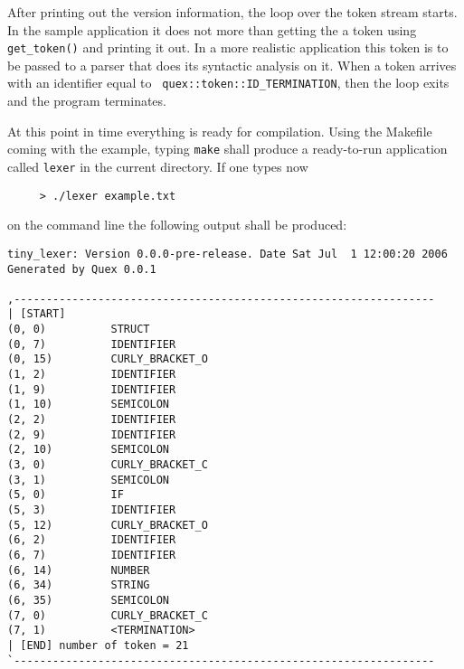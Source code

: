 After printing out the version information, the loop over the token stream
starts. In the sample application it does not more than getting the a token
using {\tt get\_token()} and printing it out. In a more realistic application
this token is to be passed to a parser that does its syntactic analysis on it.
When a token arrives with an identifier equal to {\tt
  quex::token::ID\_TERMINATION}, then the loop exits and the program
terminates.

At this point in time everything is ready for compilation. Using the Makefile
coming with the example, typing {\tt make} shall produce a ready-to-run
application called {\tt lexer}  in the current directory. If one types now

\begin{verbatim}
     > ./lexer example.txt
\end{verbatim}

on the command line the following output shall be produced:

\begin{samepage}
\begin{verbatim}
tiny_lexer: Version 0.0.0-pre-release. Date Sat Jul  1 12:00:20 2006
Generated by Quex 0.0.1

,-----------------------------------------------------------------
| [START]
(0, 0)          STRUCT
(0, 7)          IDENTIFIER
(0, 15)         CURLY_BRACKET_O
(1, 2)          IDENTIFIER
(1, 9)          IDENTIFIER
(1, 10)         SEMICOLON
(2, 2)          IDENTIFIER
(2, 9)          IDENTIFIER
(2, 10)         SEMICOLON
(3, 0)          CURLY_BRACKET_C
(3, 1)          SEMICOLON
(5, 0)          IF
(5, 3)          IDENTIFIER
(5, 12)         CURLY_BRACKET_O
(6, 2)          IDENTIFIER
(6, 7)          IDENTIFIER
(6, 14)         NUMBER
(6, 34)         STRING
(6, 35)         SEMICOLON
(7, 0)          CURLY_BRACKET_C
(7, 1)          <TERMINATION>
| [END] number of token = 21
`-----------------------------------------------------------------
\end{verbatim}
\end{samepage}

